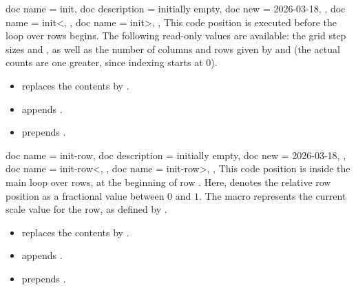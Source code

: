 \documentclass[a4paper,11pt]{article}
\begin{document}
\begin{docGeaKeys}
  [
      doc parameter   = {=\marg{code}},
  ]
  {
    {
      doc name        = init,
      doc description = {initially empty},
      doc new         = 2026-03-18,
    },
    {
      doc name        = init<,
    },
    {
      doc name        = init>,
    },
  }
  This code position is executed before the loop over rows begins. The following
  read-only values are available: the grid step sizes
   and
  , as well as the number of columns and
  rows given by  and
   (the actual counts are one greater,
  since indexing starts at $0$).
  \begin{itemize}
  \item {}  replaces the contents by .
  \item {} appends .
  \item {} prepends .
  \end{itemize}
\end{docGeaKeys}


\clearpage
\begin{docGeaKeys}
  [
      doc parameter   = {=\marg{code}},
  ]
  {
    {
      doc name        = init-row,
      doc description = {initially empty},
      doc new         = 2026-03-18,
    },
    {
      doc name        = init-row<,
    },
    {
      doc name        = init-row>,
    },
  }
  This code position is inside the main loop over rows, at the beginning of row
  . Here,
   denotes the relative row position as
  a fractional value between $0$ and $1$. The macro
   represents the current scale value for
  the row, as defined by .
  \begin{itemize}
  \item {}  replaces the contents by .
  \item {} appends .
  \item {} prepends .
  \end{itemize}
\end{docGeaKeys}
\end{document}
